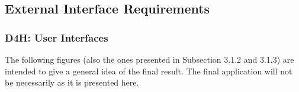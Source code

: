 {\color{Blue}\subsection{External Interface Requirements}}
{\color{Blue}\subsubsection{D4H: User Interfaces}}
The following figures (also the ones presented in Subsection 3.1.2 and 3.1.3) are intended to give a general idea of the final result. The final application will not be necessarily as it is presented here.
	
